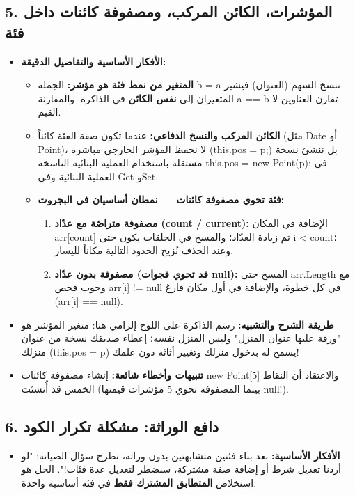 \documentclass[14pt]{extarticle}
\begin{document}
\filbreak
\subsection*{5. المؤشرات، الكائن المركب، ومصفوفة كائنات داخل فئة}
\begin{itemize}[itemsep=0.3em]
    \item \textbf{الأفكار الأساسية والتفاصيل الدقيقة:}
    \begin{itemize}
        \item \textbf{المتغير من نمط فئة هو مؤشر:} الجملة \textenglish{b = a} تنسخ السهم (العنوان) فيشير المتغيران إلى \textbf{نفس الكائن} في الذاكرة. والمقارنة \textenglish{a == b} تقارن العناوين لا القيم.
        \item \textbf{الكائن المركب والنسخ الدفاعي:} عندما تكون صفة الفئة كائناً (مثل \textenglish{Date} أو \textenglish{Point})، لا نحفظ المؤشر الخارجي مباشرة (\textenglish{this.pos = p;}) بل ننشئ نسخة مستقلة باستخدام العملية البنائية الناسخة \textenglish{this.pos = new Point(p);} في العملية البنائية وفي \textenglish{Get} و\textenglish{Set}.
        \item \textbf{فئة تحوي مصفوفة كائنات — نمطان أساسيان في البجروت:}
        \begin{enumerate}
            \item \textbf{مصفوفة متراصّة مع عدّاد (\textenglish{count} / \textenglish{current}):} الإضافة في المكان \textenglish{arr[count]} ثم زيادة العدّاد؛ والمسح في الحلقات يكون حتى \textenglish{i < count}؛ وعند الحذف نُزيح الحدود التالية مكاناً لليسار.
            \item \textbf{مصفوفة بدون عدّاد (قد تحوي فجوات \textenglish{null}):} المسح حتى \textenglish{arr.Length} مع وجوب فحص \textenglish{arr[i] != null} في كل خطوة، والإضافة في أول مكان فارغ (\textenglish{arr[i] == null}).
        \end{enumerate}
    \end{itemize}
    \item \textbf{طريقة الشرح والتشبيه:} رسم الذاكرة على اللوح إلزامي هنا: متغير المؤشر هو "ورقة عليها عنوان المنزل" وليس المنزل نفسه؛ إعطاء صديقك نسخة من عنوان منزلك (\textenglish{this.pos = p}) يسمح له بدخول منزلك وتغيير أثاثه دون علمك!
    \item \textbf{تنبيهات وأخطاء شائعة:} إنشاء مصفوفة كائنات \textenglish{new Point[5]} والاعتقاد أن النقاط الخمس قد أُنشئت (بينما المصفوفة تحوي 5 مؤشرات قيمتها \textenglish{null}!).
\end{itemize}

\filbreak
\subsection*{6. دافع الوراثة: مشكلة تكرار الكود}
\begin{itemize}[itemsep=0.3em]
    \item \textbf{الأفكار الأساسية:} بعد بناء فئتين متشابهتين بدون وراثة، نطرح سؤال الصيانة: "لو أردنا تعديل شرط أو إضافة صفة مشتركة، سنضطر لتعديل عدة فئات!". الحل هو استخلاص \textbf{المتطابق المشترك فقط} في فئة أساسية واحدة.
\end{itemize}
\end{document}
